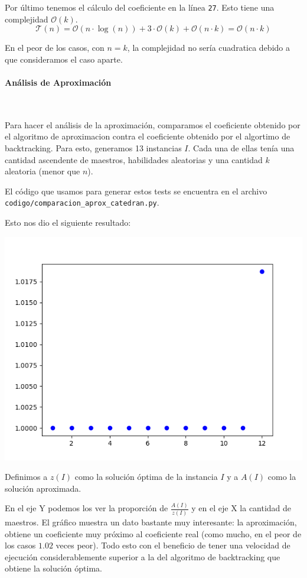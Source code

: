 \documentclass{article}
\begin{document}
Por último tenemos el cálculo del coeficiente en la línea \texttt{27}. Esto tiene una complejidad $\mathcal{O}(k)$.
$$
\mathcal{T}(n) = \mathcal{O}(n \cdot \log (n)) + 3 \cdot \mathcal{O}(k) + \mathcal{O}(n \cdot k) = \mathcal{O}(n \cdot k)
$$

En el peor de los casos, con $n = k$, la complejidad no sería cuadratica debido a que consideramos el caso aparte.

\paragraph{Análisis de Aproximación} \

Para hacer el análisis de la aproximación, comparamos el coeficiente obtenido por el algoritmo de aproximacion contra el coeficiente obtenido por el algortimo de backtracking.
Para esto, generamos 13 instancias $I$. Cada una de ellas tenía una cantidad ascendente de maestros, habilidades aleatorias y una cantidad $k$ aleatoria (menor que $n$).

El código que usamos para generar estos tests se encuentra en el archivo \texttt{codigo/comparacion\_aprox\_catedran.py}.

Esto nos dio el siguiente resultado: 

\includegraphics[scale=0.60]{images/coeficientesAprox.png}

Definimos a $z(I)$ como la solución óptima de la instancia $I$ y a $A(I)$ como la solución aproximada.

En el eje Y podemos los ver la proporción de $\frac{A(I)}{z(I)}$ y en el eje X la cantidad de maestros.
El gráfico muestra un dato bastante muy interesante: la aproximación, obtiene un coeficiente muy próximo al coeficiente real (como mucho, en el peor de los casos $1.02$ veces peor). Todo esto con el beneficio de tener una velocidad de ejecución considerablemente superior a la del algoritmo de backtracking que obtiene la solución óptima.
\end{document}
